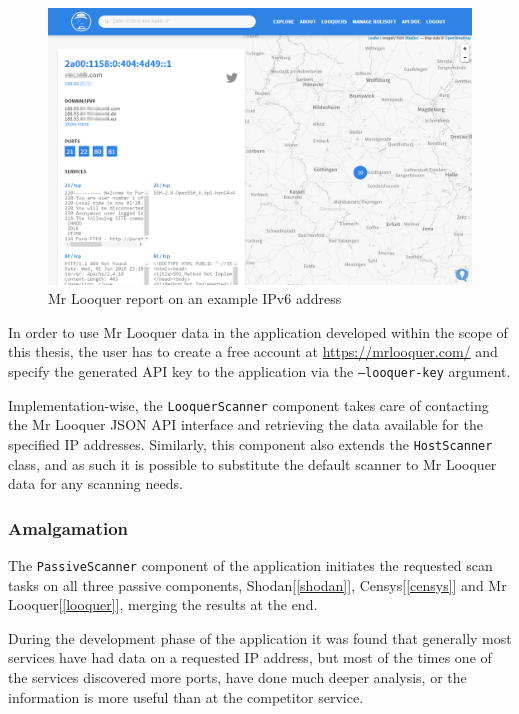 \documentclass[a4paper,12pt]{article}
\begin{document}
	\begin{figure}[!htbp]
		\centering
		\includegraphics[scale=0.355]{looquer.png}
		\caption{Mr Looquer report on an example IPv6 address}
		\label{looquerscr}
	\end{figure}
	
	In order to use Mr Looquer data in the application developed within the scope of this thesis, the user has to create a free account at \url{https://mrlooquer.com/} and specify the generated API key to the application via the \texttt{--looquer-key} argument.
		
	Implementation-wise, the \texttt{LooquerScanner} component takes care of contacting the Mr Looquer JSON API interface and retrieving the data available for the specified IP addresses. Similarly, this component also extends the \texttt{HostScanner} class, and as such it is possible to substitute the default scanner to Mr Looquer data for any scanning needs.

\subsubsection{Amalgamation}
 

	The \texttt{PassiveScanner} component of the application initiates the requested scan tasks on all three passive components, Shodan[\ref{shodan}], Censys[\ref{censys}] and Mr Looquer[\ref{looquer}], merging the results at the end.
	
	During the development phase of the application it was found that generally most services have had data on a requested IP address, but most of the times one of the services discovered more ports, have done much deeper analysis, or the information is more useful than at the competitor service.
	
\end{document}
